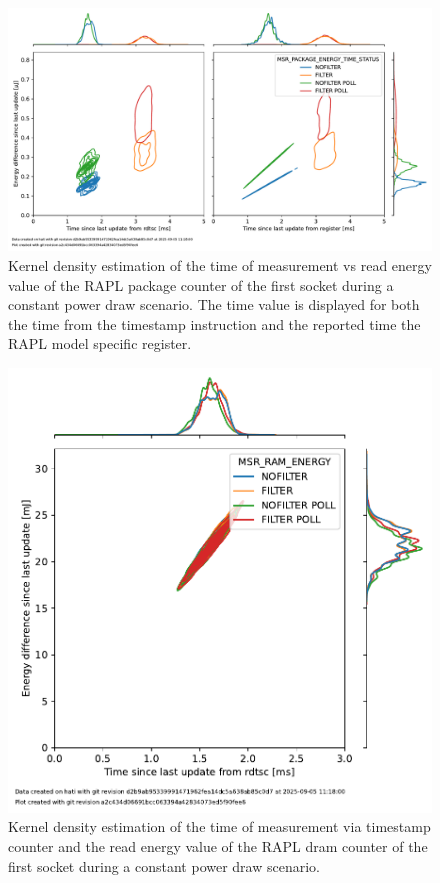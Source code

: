\begin{figure}[]
    \centering
    \includegraphics[width=0.8\columnwidth]{fig/rapl-update-intervals/MSR_PACKAGE_ENERGY_TIME_STATUS_2000000.pdf}
    \caption{\label{fig:rapl-update-intervals-package}Kernel density estimation of the time of measurement vs read energy value of the RAPL package counter of the first socket during a constant power draw scenario.
    The time value is displayed for both the time from the timestamp instruction and the reported time the RAPL model specific register.}
\end{figure}

\begin{figure}[]
    \centering
    \includegraphics[width=0.44\columnwidth]{fig/rapl-update-intervals/MSR_RAM_ENERGY_2000000.pdf}
    \caption{\label{fig:rapl-update-intervals-dram}Kernel density estimation of the time of measurement via timestamp counter and the read energy value of the RAPL dram counter of the first socket during a constant power draw scenario.}
\end{figure}